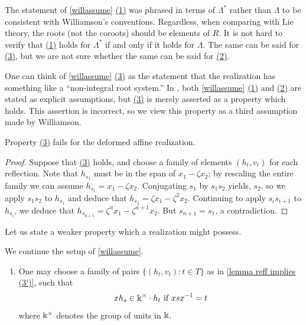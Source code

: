 \begin{remark} The statement of \cref{willassume} \hyperref[assumption 1]{(1)} was phrased in terms of $\Lambda^*$ rather than $\Lambda$ to be consistent with Williamson's conventions. Regardless, when comparing with Lie theory, the roots (not the coroots) should be elements of $R$. It is not hard to verify that \hyperref[assumption 1]{(1)} holds for $\Lambda^*$ if and only if it holds for $\Lambda$. The same can be said for \hyperref[assumption 3]{(3)}, but we are not sure whether the same can be said for \hyperref[assumption 2]{(2)}. \end{remark}

\begin{remark} One can think of \cref{willassume} \hyperref[assumption 3]{(3)} as the statement that the realization has something like a ``non-integral root system.'' In \cite[Section 4.1]{WillSingular}, both \cref{willassume} \hyperref[assumption 1]{(1)} and \hyperref[assumption 2]{(2)} are stated as explicit assumptions, but \hyperref[assumption 3]{(3)} is merely asserted as a property which holds. This assertion is incorrect, so we view this property as a third assumption made by Williamson. \end{remark}

\begin{lemma} Property \hyperref[assumption 3]{(3)} fails for the deformed affine realization. \end{lemma}

\begin{proof} Suppose that \hyperref[assumption 3]{(3)} holds, and choose a family of elements $(h_t, v_t)$ for each reflection. Note that $h_{s_1}$ must be in the span of $x_1 - \zeta x_2$; by rescaling the entire family we can assume $h_{s_1} = x_1 - \zeta x_2$. Conjugating $s_1$ by $s_1 s_2$ yields, $s_2$, so we apply $s_1 s_2$ to $h_{s_1}$ and deduce that $h_{s_2} = \zeta x_1 - \zeta^2 x_2$. Continuing to apply $s_i s_{i+1}$ to $h_{s_i}$, we deduce that $h_{s_{n+1}} = \zeta^{n} x_1 - \zeta^{n+1} x_2$. But $s_{n+1} = s_1$, a contradiction. \end{proof}

Let us state a weaker property which a realization might possess. 

\begin{property} We continue the setup of \cref{willassume}.
\begin{enumerate}
    \item[(3')]\label{assumption 3'} 
    One may choose a family of pairs $\{(h_t, v_t) \colon t \in T\}$ as in \cref{lemma reff implies (3')}, such that
    $$xh_s \in \Bbbk^\times \cdot h_t \text{ if } xsx^{-1} = t$$
    where $\Bbbk^\times$ denotes the group of units in $\Bbbk$.  
\end{enumerate}
\end{property}


